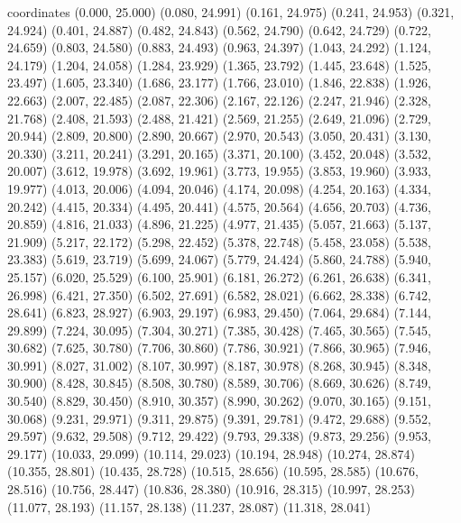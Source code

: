 coordinates {
  (0.000, 25.000)
  (0.080, 24.991)
  (0.161, 24.975)
  (0.241, 24.953)
  (0.321, 24.924)
  (0.401, 24.887)
  (0.482, 24.843)
  (0.562, 24.790)
  (0.642, 24.729)
  (0.722, 24.659)
  (0.803, 24.580)
  (0.883, 24.493)
  (0.963, 24.397)
  (1.043, 24.292)
  (1.124, 24.179)
  (1.204, 24.058)
  (1.284, 23.929)
  (1.365, 23.792)
  (1.445, 23.648)
  (1.525, 23.497)
  (1.605, 23.340)
  (1.686, 23.177)
  (1.766, 23.010)
  (1.846, 22.838)
  (1.926, 22.663)
  (2.007, 22.485)
  (2.087, 22.306)
  (2.167, 22.126)
  (2.247, 21.946)
  (2.328, 21.768)
  (2.408, 21.593)
  (2.488, 21.421)
  (2.569, 21.255)
  (2.649, 21.096)
  (2.729, 20.944)
  (2.809, 20.800)
  (2.890, 20.667)
  (2.970, 20.543)
  (3.050, 20.431)
  (3.130, 20.330)
  (3.211, 20.241)
  (3.291, 20.165)
  (3.371, 20.100)
  (3.452, 20.048)
  (3.532, 20.007)
  (3.612, 19.978)
  (3.692, 19.961)
  (3.773, 19.955)
  (3.853, 19.960)
  (3.933, 19.977)
  (4.013, 20.006)
  (4.094, 20.046)
  (4.174, 20.098)
  (4.254, 20.163)
  (4.334, 20.242)
  (4.415, 20.334)
  (4.495, 20.441)
  (4.575, 20.564)
  (4.656, 20.703)
  (4.736, 20.859)
  (4.816, 21.033)
  (4.896, 21.225)
  (4.977, 21.435)
  (5.057, 21.663)
  (5.137, 21.909)
  (5.217, 22.172)
  (5.298, 22.452)
  (5.378, 22.748)
  (5.458, 23.058)
  (5.538, 23.383)
  (5.619, 23.719)
  (5.699, 24.067)
  (5.779, 24.424)
  (5.860, 24.788)
  (5.940, 25.157)
  (6.020, 25.529)
  (6.100, 25.901)
  (6.181, 26.272)
  (6.261, 26.638)
  (6.341, 26.998)
  (6.421, 27.350)
  (6.502, 27.691)
  (6.582, 28.021)
  (6.662, 28.338)
  (6.742, 28.641)
  (6.823, 28.927)
  (6.903, 29.197)
  (6.983, 29.450)
  (7.064, 29.684)
  (7.144, 29.899)
  (7.224, 30.095)
  (7.304, 30.271)
  (7.385, 30.428)
  (7.465, 30.565)
  (7.545, 30.682)
  (7.625, 30.780)
  (7.706, 30.860)
  (7.786, 30.921)
  (7.866, 30.965)
  (7.946, 30.991)
  (8.027, 31.002)
  (8.107, 30.997)
  (8.187, 30.978)
  (8.268, 30.945)
  (8.348, 30.900)
  (8.428, 30.845)
  (8.508, 30.780)
  (8.589, 30.706)
  (8.669, 30.626)
  (8.749, 30.540)
  (8.829, 30.450)
  (8.910, 30.357)
  (8.990, 30.262)
  (9.070, 30.165)
  (9.151, 30.068)
  (9.231, 29.971)
  (9.311, 29.875)
  (9.391, 29.781)
  (9.472, 29.688)
  (9.552, 29.597)
  (9.632, 29.508)
  (9.712, 29.422)
  (9.793, 29.338)
  (9.873, 29.256)
  (9.953, 29.177)
  (10.033, 29.099)
  (10.114, 29.023)
  (10.194, 28.948)
  (10.274, 28.874)
  (10.355, 28.801)
  (10.435, 28.728)
  (10.515, 28.656)
  (10.595, 28.585)
  (10.676, 28.516)
  (10.756, 28.447)
  (10.836, 28.380)
  (10.916, 28.315)
  (10.997, 28.253)
  (11.077, 28.193)
  (11.157, 28.138)
  (11.237, 28.087)
  (11.318, 28.041)
}
